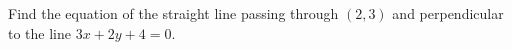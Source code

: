 Find the equation of the straight line passing through $(2,3)$ and perpendicular to the line $3x+2y+4=0$.
